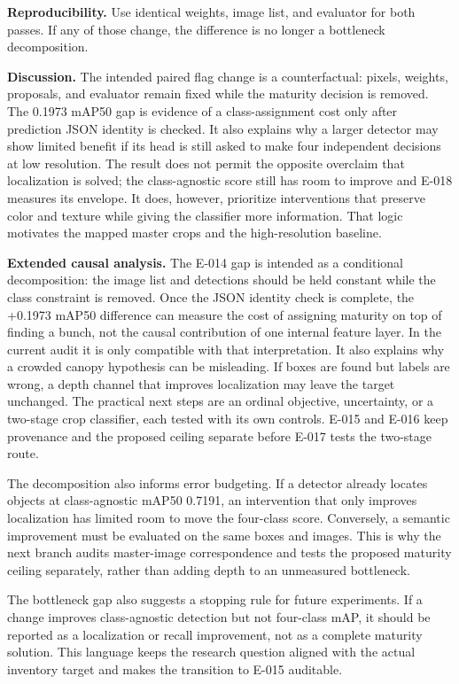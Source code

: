 \documentclass[preprint,12pt]{elsarticle}
\begin{document}
\textbf{Reproducibility.} Use identical weights, image list, and evaluator for
both passes. If any of those change, the difference is no longer a
bottleneck decomposition.

\textbf{Discussion.} The intended paired flag change is a counterfactual:
pixels, weights, proposals, and evaluator remain fixed while the maturity
decision is removed. The 0.1973 mAP50 gap is evidence of a class-assignment
cost only after prediction JSON identity is checked. It also explains
why a larger detector may show limited benefit if its head is still asked to
make four independent decisions at low resolution. The result does not
permit the opposite overclaim that localization is solved; the class-agnostic
score still has room to improve and E-018 measures its envelope. It does,
however, prioritize interventions that preserve color and texture while
giving the classifier more information. That logic motivates the mapped
master crops and the high-resolution baseline.

\textbf{Extended causal analysis.} The E-014 gap is intended as a conditional
decomposition: the image list and detections should be held constant while the
class constraint is removed. Once the JSON identity check is complete, the
+0.1973 mAP50 difference can measure the cost of assigning maturity on top of
finding a bunch, not the causal contribution of one internal feature layer. In
the current audit it is only compatible with that interpretation. It also
explains why a crowded
canopy hypothesis can be misleading. If boxes are found but labels are
wrong, a depth channel that improves localization may leave the target
unchanged. The practical next steps are an ordinal objective, uncertainty,
or a two-stage crop classifier, each tested with its own controls. E-015 and
E-016 keep provenance and the proposed ceiling separate before E-017 tests the
two-stage route.

The decomposition also informs error budgeting. If a detector already locates
objects at class-agnostic mAP50 0.7191, an intervention that only improves
localization has limited room to move the four-class score. Conversely, a
semantic improvement must be evaluated on the same boxes and images. This is
why the next branch audits master-image correspondence and tests the proposed
maturity ceiling separately, rather than adding depth to an unmeasured
bottleneck.

The bottleneck gap also suggests a stopping rule for future experiments. If a
change improves class-agnostic detection but not four-class mAP, it should be
reported as a localization or recall improvement, not as a complete maturity
solution. This language keeps the research question aligned with the actual
inventory target and makes the transition to E-015 auditable.
\end{document}
